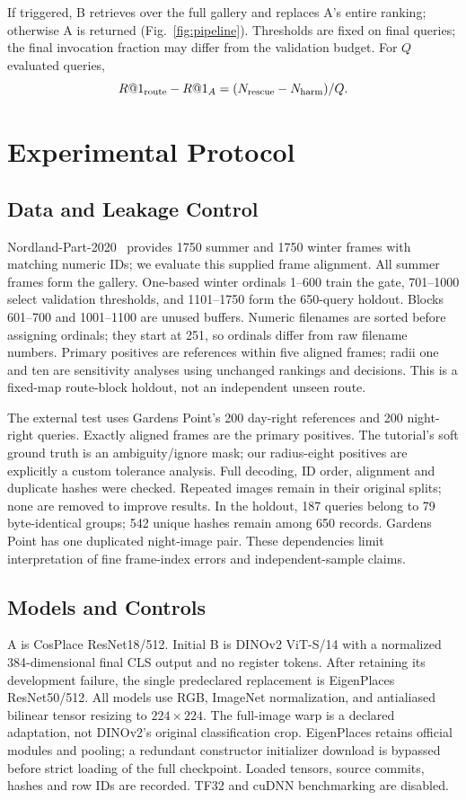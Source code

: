 \documentclass[conference]{IEEEtran}
\begin{document}
If triggered, B retrieves over the full gallery and replaces A's entire
ranking; otherwise A is returned (Fig.~\ref{fig:pipeline}). Thresholds are
fixed on final queries; the final invocation fraction may differ from the
validation budget. For $Q$ evaluated queries,
\begin{equation}
R@1_{\rm route}-R@1_A=(N_{\rm rescue}-N_{\rm harm})/Q.
\end{equation}

\section{Experimental Protocol}
\subsection{Data and Leakage Control}
Nordland-Part-2020~\cite{nordland} provides 1750 summer and 1750 winter
frames with matching numeric IDs; we evaluate this supplied frame alignment. All summer frames form the gallery. One-based winter ordinals
1--600 train the gate, 701--1000 select validation thresholds, and
1101--1750 form the 650-query holdout. Blocks 601--700 and
1001--1100 are unused buffers. Numeric filenames are sorted before
assigning ordinals; they start at 251, so ordinals differ from raw filename
numbers. Primary positives are references within five aligned frames;
radii one and ten are sensitivity analyses using unchanged
rankings and decisions. This is a fixed-map route-block holdout, not an
independent unseen route.

The external test uses Gardens Point's 200 day-right references
and 200 night-right queries. Exactly aligned frames are the primary
positives. The tutorial's soft ground truth is an ambiguity/ignore mask;
our radius-eight positives are explicitly a custom tolerance analysis.
Full decoding, ID order, alignment and duplicate hashes were checked.
Repeated images remain in their original splits; none are removed to
improve results. In the holdout, 187 queries belong to 79 byte-identical
groups; 542 unique hashes remain among 650 records. Gardens Point has
one duplicated night-image pair. These dependencies limit interpretation
of fine frame-index errors and independent-sample claims.

\subsection{Models and Controls}
A is CosPlace ResNet18/512. Initial B is DINOv2 ViT-S/14 with a normalized
384-dimensional final CLS output and no register tokens. After retaining
its development failure, the single predeclared replacement is
EigenPlaces ResNet50/512. All models use RGB, ImageNet normalization,
and antialiased bilinear tensor resizing to $224\times224$. The full-image
warp is a declared adaptation, not DINOv2's original classification crop.
EigenPlaces retains official modules and pooling; a redundant constructor
initializer download is bypassed before strict loading of the full
checkpoint. Loaded tensors, source commits, hashes and row IDs are
recorded. TF32 and cuDNN benchmarking are disabled.
\end{document}

